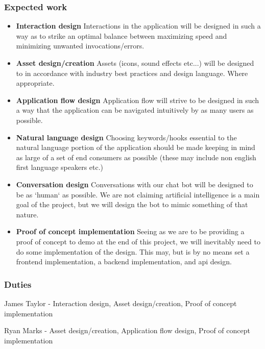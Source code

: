 \documentclass{sigchi}
\begin{document}
\subsubsection{Expected work}
\begin{itemize}
\item{\textbf{Interaction design}}
Interactions in the application will be designed in such a way as to strike an optimal balance between maximizing speed and minimizing unwanted invocations/errors.

\item{\textbf{Asset design/creation}}
Assets (icons, sound effects etc...) will be designed to in accordance with industry best practices and design language. Where appropriate.

\item{\textbf{Application flow design}}
Application flow will strive to be designed in such a way that the application can be navigated intuitively by as many users as possible.

\item{\textbf{Natural language design}}
Choosing keywords/hooks essential to the natural language portion of the application should be made keeping in mind as large of a set of end consumers as possible (these may include non english first language speakers etc.)

\item{\textbf{Conversation design}}
Conversations with our chat bot will be designed to be as `human` as possible. We are not claiming artificial intelligence is a main goal of the project, but we will design the bot to mimic something of that nature.

\item{\textbf{Proof of concept implementation}}
Seeing as we are to be providing a proof of concept to demo at the end of this project, we will inevitably need to do some implementation of the design. This may, but is by no means set a frontend implementation, a backend implementation, and api design.

\end{itemize}
\subsubsection{Duties}

James Taylor - Interaction design, Asset design/creation, Proof of concept implementation

Ryan Marks - Asset design/creation, Application flow design, Proof of concept implementation
\end{document}
